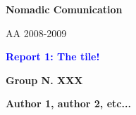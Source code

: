 \documentclass[12pt]{article}
\begin{document}
\begin{titlepage}
\begin{figure}[ht]
	\end{figure}
	{
	\large \bfseries Nomadic Comunication\par
	AA 2008-2009
	}\par
	\vspace{1.5cm}
	{
	\Large \bfseries \textcolor{blue}{Report 1: The tile!} \par
	}
	\vspace{1.0cm}
	{
	\large \bfseries {Group N. XXX} \par
	}
	\vspace{0.3cm}
	{
	\large \bfseries {Author 1, author 2, etc...}
	}
	\vspace{1.0cm}
	\begin{abstract}
	\end{abstract}
\end{titlepage}

\thispagestyle{empty}
\tableofcontents
\clearpage
\setcounter{page}{1}

%
%
%
\end{document}
